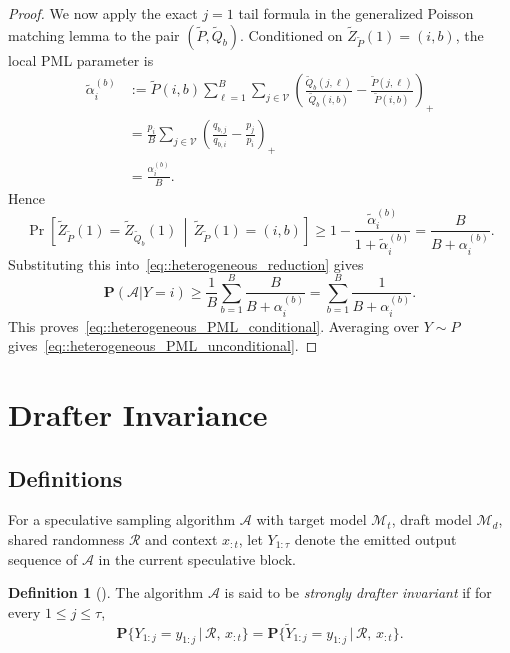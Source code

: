 \documentclass{article}
\theoremstyle{plain}
\theoremstyle{definition}
\newtheorem{definition}[theorem]{Definition}
\begin{document}
\begin{proof}
We now apply the exact $j=1$ tail formula in the generalized Poisson matching
lemma to the pair $(\widetilde P,\widetilde Q_b)$. Conditioned on
$\tilde Z_{\widetilde P}(1)=(i,b)$, the local PML parameter is
\[
\begin{aligned}
    \widetilde\alpha_i^{(b)}
    &:=
    \widetilde P(i,b)
    \sum_{\ell=1}^B
    \sum_{j\in\mathcal V}
    \left(
        \frac{\widetilde Q_b(j,\ell)}{\widetilde Q_b(i,b)}
        -
        \frac{\widetilde P(j,\ell)}{\widetilde P(i,b)}
    \right)_+  \\
    &=
    \frac{p_i}{B}
    \sum_{j\in\mathcal V}
    \left(
        \frac{q_{b,j}}{q_{b,i}}
        -
        \frac{p_j}{p_i}
    \right)_+  \\
    &=
    \frac{\alpha_i^{(b)}}{B}.
\end{aligned}
\]
Hence
\[
    \Pr\!\left[
        \tilde Z_{\widetilde P}(1)=\tilde Z_{\widetilde Q_b}(1)
        \,\middle|\,
        \tilde Z_{\widetilde P}(1)=(i,b)
    \right]
    \ge
    1-\frac{\widetilde\alpha_i^{(b)}}{1+\widetilde\alpha_i^{(b)}}
    =
    \frac{B}{B+\alpha_i^{(b)}}.
\]
Substituting this into~\eqref{eq::heterogeneous_reduction} gives
\[
    \mathbf{P}(\mathcal A| Y=i)
    \ge
    \frac1B
    \sum_{b=1}^B
    \frac{B}{B+\alpha_i^{(b)}}
    =
    \sum_{b=1}^B
    \frac{1}{B+\alpha_i^{(b)}}.
\]
This proves~\eqref{eq::heterogeneous_PML_conditional}. Averaging over
$Y\sim P$ gives~\eqref{eq::heterogeneous_PML_unconditional}.
\end{proof}


\section{Drafter Invariance}


\subsection{Definitions}

For a speculative sampling algorithm $\mathcal{A}$ with target model $\mathcal{M}_t$, draft model $\mathcal{M}_d$, shared randomness $\mathcal{R}$ and context $x_{:t}$, let $Y_{1:\tau}$ denote the emitted output sequence of $\mathcal{A}$ in the current speculative block.


\begin{definition}[\citep{daliri2025coupling}]
\label{def:strong_drafter_invariance_single}
The algorithm $\mathcal{A}$ is said to be \emph{strongly drafter invariant} if for every $1\le j\le \tau$,
\begin{equation*}
\mathbf{P}\big\{
Y_{1:j}=y_{1:j}\,\big|\,\mathcal{R},\,x_{:t}
\big\} =
\mathbf{P}\big\{
\widetilde{Y}_{1:j}=y_{1:j}\,\Big|\,\mathcal{R},\,x_{:t}
\big\}. 
\end{equation*}
\end{definition}
\end{document}
